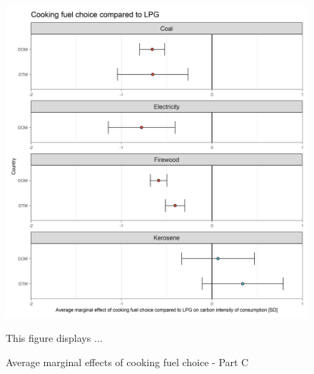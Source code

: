 \documentclass[12pt, a4paper]{article}
\newenvironment{subcaption}
{\strut
\vspace{-5pt}
\begin{minipage}[b]{0.9\textwidth}
  \hspace*{-\parindent}
  \footnotesize}
 {\end{minipage}}
\begin{document}
\begin{figure}[ht!]
  \centering
 \caption{Average marginal effects of cooking fuel choice - Part C} \label{fig:E8_LPG}
  \includegraphics{Analysis_OLS_ME_Carbon_Intensity/AME_OLS_CI_CI_LPG}
  \begin{subcaption}
    This figure displays ...
  \end{subcaption}

\end{figure}

\clearpage
\end{document}
